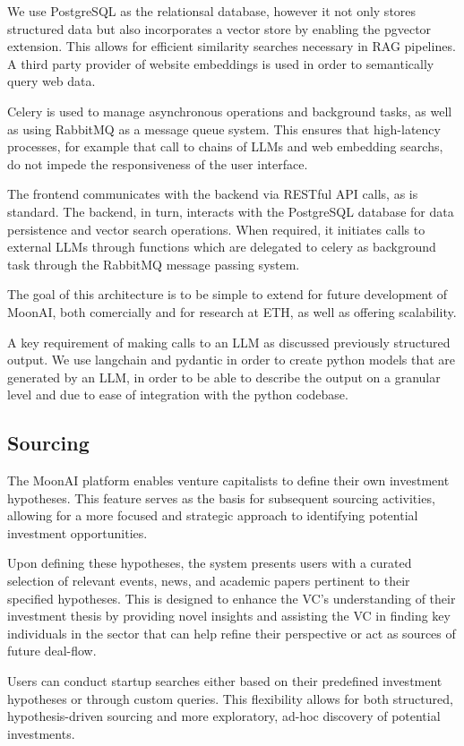 \documentclass[a4paper, oneside]{discothesis}
\begin{document}
We use PostgreSQL as the relationsal database, however it not only stores structured data but also incorporates a vector store by enabling the pgvector extension. This allows for efficient similarity searches necessary in RAG pipelines. A third party provider of website embeddings is used in order to semantically query web data.

Celery is used to manage asynchronous operations and background tasks, as well as using RabbitMQ as a message queue system. This ensures that high-latency processes, for example that call to chains of LLMs and web embedding searchs, do not impede the responsiveness of the user interface.

The frontend communicates with the backend via RESTful API calls, as is standard. The backend, in turn, interacts with the PostgreSQL database for data persistence and vector search operations. When required, it initiates calls to external LLMs through functions which  are delegated to celery  as background task through the RabbitMQ message passing system.

The goal of this architecture is to be simple to extend for future development of MoonAI, both comercially and for research at ETH, as well as offering scalability.

A key requirement of making calls to an LLM as discussed previously structured output. We use langchain and pydantic in order to create python models that are generated by an LLM, in order to be able to describe the output on a granular level and due to ease of integration with the python codebase. 

\subsection{Sourcing}
The MoonAI platform enables venture capitalists to define their own investment hypotheses. 
This feature serves as the basis for subsequent sourcing activities, allowing for a more focused and strategic approach to identifying potential investment opportunities.

Upon defining these hypotheses, the system presents users with a curated selection of relevant events, news, and academic papers pertinent to their specified hypotheses. This is designed to enhance the VC's understanding of their investment thesis by providing novel insights and assisting the VC in finding key individuals in the sector that can help refine their perspective or act as sources of future deal-flow.

Users can conduct startup searches either based on their predefined investment hypotheses or through custom queries. This flexibility allows for both structured, hypothesis-driven sourcing and more exploratory, ad-hoc discovery of potential investments.
\end{document}
